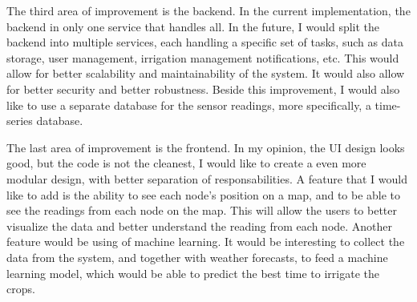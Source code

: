 The third area of improvement is the backend. In the current implementation, the backend in only
one service that handles all. In the future, I would split the backend into multiple services,
each handling a specific set of tasks, such as data storage, user management, irrigation management
notifications, etc. This would allow for better scalability and maintainability of the system. It would
also allow for better security and better robustness. Beside this improvement, I would also like
to use a separate database for the sensor readings, more specifically, a time-series database.

The last area of improvement is the frontend. In my opinion, the UI design looks good, but the code 
is not the cleanest, I would like to create a even more modular design, with better separation of responsabilities.
A feature that I would like to add is the ability to see each node's position on a map,
and to be able to see the readings from each node on the map. This will allow the users
to better visualize the data and better understand the reading from each node. 
Another feature would be using of machine learning. It would be interesting to collect the data from the system,
and together with weather forecasts, to feed a machine learning model, 
which would be able to predict the best time to irrigate the crops.

